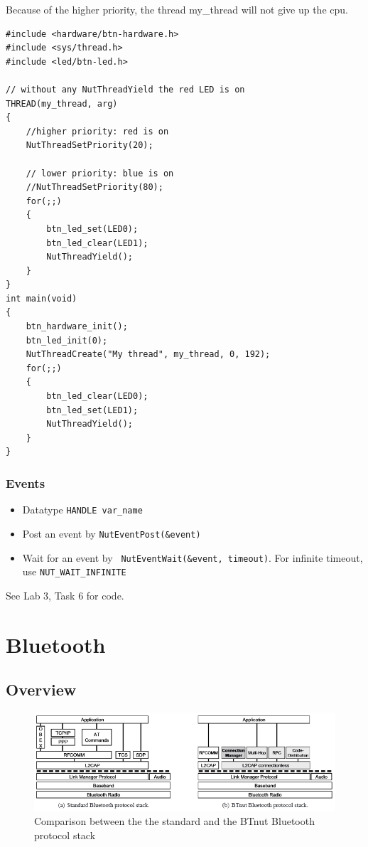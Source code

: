 Because of the higher priority, the thread my\_thread will not give up the cpu.
\begin{lstlisting}[basicstyle=\small]
#include <hardware/btn-hardware.h>
#include <sys/thread.h>
#include <led/btn-led.h>

// without any NutThreadYield the red LED is on
THREAD(my_thread, arg)
{
	//higher priority: red is on
	NutThreadSetPriority(20);
	
	// lower priority: blue is on
	//NutThreadSetPriority(80);
	for(;;)
	{
		btn_led_set(LED0);
		btn_led_clear(LED1);
		NutThreadYield();
	}
}
int main(void)
{
	btn_hardware_init();
	btn_led_init(0);
	NutThreadCreate("My thread", my_thread, 0, 192);
	for(;;)
	{
		btn_led_clear(LED0);
		btn_led_set(LED1);
		NutThreadYield();
	}
}
\end{lstlisting}


\subsubsection{Events}
\begin{itemize}[noitemsep]
\item Datatype \texttt {HANDLE var\_name }
\item Post an event by \texttt{NutEventPost(\&event) }
\item Wait for an event by \texttt { NutEventWait(\&event, timeout)}. For infinite timeout, use \texttt {NUT\_WAIT\_INFINITE}
\end{itemize}

\begin{tnote}
See Lab 3, Task 6 for code.
\end{tnote}


\section{Bluetooth}

\subsection{Overview}

\begin{figure}[ht]
	\centering
  	\includegraphics[scale=0.5]{img/lab_bluetooth_overview.png}
	\caption{Comparison between the the standard and the BTnut Bluetooth protocol stack}
	\label{fig_bluetooth_overview}
\end{figure}

